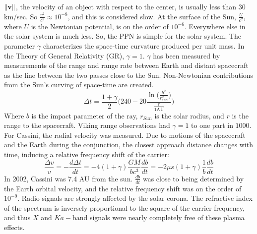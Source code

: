 \documentclass{article}
\begin{document}
            $\lVert\mathbf{v}\rVert$, the velocity of an object with respect to the
            center, is usually less than 30 km/sec. So $\frac{v^2}{c^2}
            \approx 10^{-8}$, and this is considered slow. At the surface of
            the Sun, $\frac{U}{c^2}$, where $U$ is the Newtonian potential, is
            on the order of $10^{-6}$. Everywhere else in the solar system is
            much less. So, the PPN is simple for the solar system. The
            parameter $\gamma$ characterizes the space-time curvature produced
            per unit mass. In the Theory of General Relativity (GR),
            $\gamma=1$. $\gamma$ has been measured by measurements of the
            range and range rate between Earth and distant spacecraft as the
            line between the two passes close to the Sun. Non-Newtonian
            contributions from the Sun's curving of space-time are created. 
            \begin{equation}
            \Delta t=\frac{1+\gamma}{2}
                \bigg(240- 20
                    \frac{\ln\bigg(\frac{b^2}{r_{sun}^2}\bigg)}
                         {\frac{r}{1\textrm{AU}}}\bigg)
            \end{equation}
            Where $b$ is the impact parameter of the ray, $r_{Sun}$ is the
            solar radius, and $r$ is the range to the spacecraft. Viking range
            observations had $\gamma=1$ to one part in $1000$. For Cassini,
            the radial velocity was measured. Due to motions of the spacecraft
            and the Earth during the conjunction, the closest approach
            distance changes with time, inducing a relative frequency shift of
            the carrier:
            \begin{equation}
                \frac{\Delta v}{v}=-\frac{d\Delta t}{dt}
                                  =-4(1+\gamma)\frac{GM}{bc^3}\frac{db}{dt}
                                  =-2\mu s(1+\gamma)\frac{1}{b}\frac{db}{dt}
            \end{equation}
            In 2002, Cassini was 7.4 AU from the sun. $\frac{db}{dt}$ was
            close to being determined by the Earth orbital velocity, and the
            relative frequency shift was on the order of $10^{-9}$. Radio
            signals are strongly affected by the solar corona. The refractive
            index of the spectrum is inversely proportional to the square of
            the carrier frequency, and thus $X$ and $Ka-$band signals were
            nearly completely free of these plasma effects.
\end{document}
